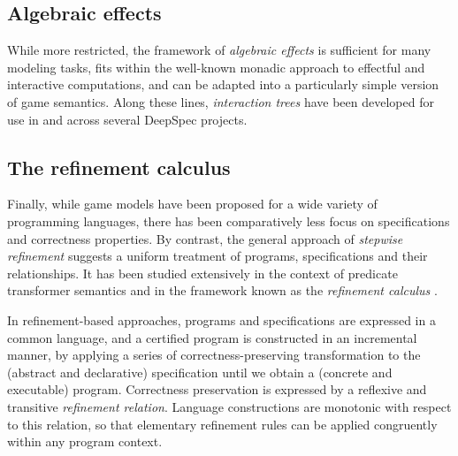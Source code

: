 \documentclass[draft,11pt]{report}
\begin{document}
\subsection{Algebraic effects}

While more restricted,
the framework of \emph{algebraic effects} \citep{effadq}
is sufficient for many modeling tasks,
fits within the well-known monadic approach
to effectful and interactive computations,
and can be adapted into a particularly simple version
of game semantics.
Along these lines,
\emph{interaction trees} \citep{itree}
have been developed for use in and across
several DeepSpec projects.


\subsection{The refinement calculus}

Finally,
while game models have been proposed
for a wide variety of programming languages,
there has been comparatively less focus
on specifications and correctness properties.
By contrast,
the general approach of \emph{stepwise refinement}
suggests a uniform treatment of programs, specifications
and their relationships.
It has been studied extensively in the context of
predicate transformer semantics \citep{gc}
and in the framework known as the \emph{refinement calculus} \citep{refcal}.

In refinement-based approaches,
programs and specifications are expressed in a common language,
and a certified program is constructed in an incremental manner,
by applying a series of correctness-preserving transformation
to the (abstract and declarative) specification
until we obtain a (concrete and executable) program.
Correctness preservation is expressed
by a reflexive and transitive \emph{refinement relation}.
Language constructions are monotonic with respect to this relation,
so that elementary refinement rules
can be applied congruently within any program context.
\end{document}
